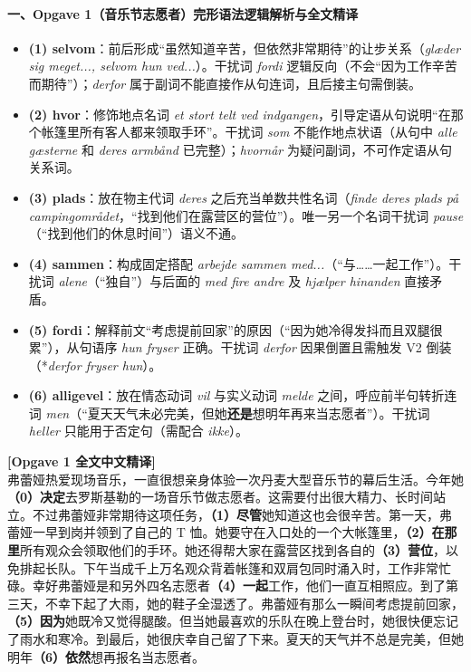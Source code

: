 \paragraph*{一、Opgave 1（音乐节志愿者）完形语法逻辑解析与全文精译}
\begin{itemize}
  \item \textbf{(1) selvom}：前后形成“虽然知道辛苦，但依然非常期待”的让步关系（\textit{glæder sig meget..., selvom hun ved...}）。干扰词 \textit{fordi} 逻辑反向（不会“因为工作辛苦而期待”）；\textit{derfor} 属于副词不能直接作从句连词，且后接主句需倒装。
  \item \textbf{(2) hvor}：修饰地点名词 \textit{et stort telt ved indgangen}，引导定语从句说明“在那个帐篷里所有客人都来领取手环”。干扰词 \textit{som} 不能作地点状语（从句中 \textit{alle gæsterne} 和 \textit{deres armbånd} 已完整）；\textit{hvornår} 为疑问副词，不可作定语从句关系词。
  \item \textbf{(3) plads}：放在物主代词 \textit{deres} 之后充当单数共性名词（\textit{finde deres plads på campingområdet}，“找到他们在露营区的营位”）。唯一另一个名词干扰词 \textit{pause}（“找到他们的休息时间”）语义不通。
  \item \textbf{(4) sammen}：构成固定搭配 \textit{arbejde sammen med...}（“与……一起工作”）。干扰词 \textit{alene}（“独自”）与后面的 \textit{med fire andre} 及 \textit{hjælper hinanden} 直接矛盾。
  \item \textbf{(5) fordi}：解释前文“考虑提前回家”的原因（“因为她冷得发抖而且双腿很累”），从句语序 \textit{hun fryser} 正确。干扰词 \textit{derfor} 因果倒置且需触发 V2 倒装（*\textit{derfor fryser hun}）。
  \item \textbf{(6) alligevel}：放在情态动词 \textit{vil} 与实义动词 \textit{melde} 之间，呼应前半句转折连词 \textit{men}（“夏天天气未必完美，但她\textbf{还是}想明年再来当志愿者”）。干扰词 \textit{heller} 只能用于否定句（需配合 \textit{ikke}）。
\end{itemize}

\begin{transbox}
\small
\textbf{\color{NCDTeal}[Opgave 1 全文中文精译]}\\
弗蕾娅热爱现场音乐，一直很想亲身体验一次丹麦大型音乐节的幕后生活。今年她\textbf{（0）决定}去罗斯基勒的一场音乐节做志愿者。这需要付出很大精力、长时间站立。不过弗蕾娅非常期待这项任务，\textbf{（1）尽管}她知道这也会很辛苦。第一天，弗蕾娅一早到岗并领到了自己的 T 恤。她要守在入口处的一个大帐篷里，\textbf{（2）在那里}所有观众会领取他们的手环。她还得帮大家在露营区找到各自的\textbf{（3）营位}，以免排起长队。下午当成千上万名观众背着帐篷和双肩包同时涌入时，工作非常忙碌。幸好弗蕾娅是和另外四名志愿者\textbf{（4）一起}工作，他们一直互相照应。到了第三天，不幸下起了大雨，她的鞋子全湿透了。弗蕾娅有那么一瞬间考虑提前回家，\textbf{（5）因为}她既冷又觉得腿酸。但当她最喜欢的乐队在晚上登台时，她很快便忘记了雨水和寒冷。到最后，她很庆幸自己留了下来。夏天的天气并不总是完美，但她明年\textbf{（6）依然}想再报名当志愿者。
\end{transbox}

